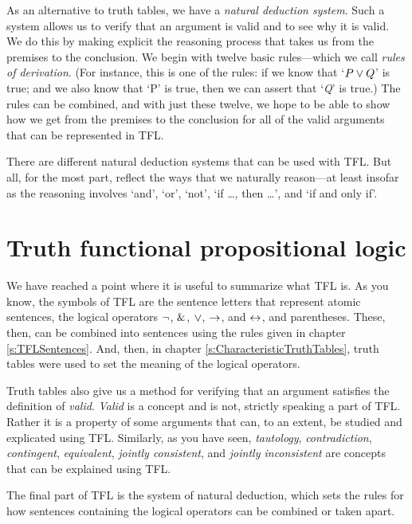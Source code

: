 As an alternative to truth tables, we have a \textit{natural deduction system}. Such a system allows us to verify that an argument is valid and to see why it is valid. We do this by making explicit the reasoning process that takes us from the premises to the conclusion. We begin with twelve basic rules---which we call \textit{rules of derivation}. (For instance, this is one of the rules: if we know that `$P \vee Q$' is true; and we also know that `\enot P' is true, then we can assert that `\textit{Q}' is true.) The rules can be combined, and with just these twelve, we hope to be able to show how we get from the premises to the conclusion for all of the valid arguments that can be represented in TFL. 

There are different natural deduction systems that can be used with TFL. But all, for the most part, reflect the ways that we naturally reason---at least insofar as the reasoning involves ‘and’, ‘or’, ‘not’, ‘if \ldots, then \ldots’, and ‘if and only if’. 


\section{Truth functional propositional logic}

We have reached a point where it is useful to summarize what TFL is. As you know, the symbols of TFL are the sentence letters that represent atomic sentences, the logical operators ${\neg}$, $\mathbin{\&}$, $\vee$, $\rightarrow$, and $\leftrightarrow$, and parentheses. These, then, can be combined into sentences using the rules given in chapter \ref{s:TFLSentences}. And, then, in chapter \ref{s:CharacteristicTruthTables}, truth tables were used to set the meaning of the logical operators. 

Truth tables also give us a method for verifying that an argument satisfies the definition of \textit{valid}. \textit{Valid} is a concept and is not, strictly speaking a part of TFL. Rather it is a property of some arguments that can, to an extent, be studied and explicated using TFL. Similarly, as you have seen, \textit{tautology}, \textit{contradiction}, \textit{contingent}, \textit{equivalent},  \textit{jointly consistent}, and \textit{jointly inconsistent} are concepts that can be explained using TFL.

The final part of TFL is the system of natural deduction, which sets the rules for how sentences containing the logical operators can be combined or taken apart. 

